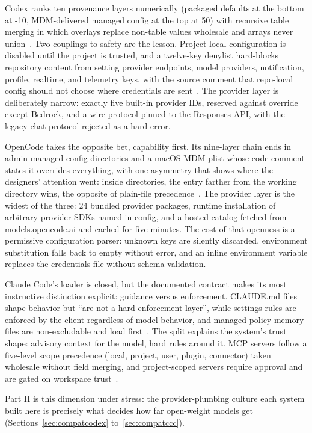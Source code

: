 \documentclass{article}
\newcommand{\codex}[0]{Codex}
\newcommand{\occ}[0]{OpenCode}
\newcommand{\ccc}[0]{Claude Code}
\begin{document}
\codex{} ranks ten provenance layers numerically (packaged defaults at
the bottom at -10, MDM-delivered managed config at the top at 50) with
recursive table merging in which overlays replace non-table values
wholesale and arrays never union~\citep{codexRepo}. Two couplings to
safety are the lesson. Project-local configuration is disabled until the
project is trusted, and a twelve-key denylist hard-blocks repository
content from setting provider endpoints, model providers, notification,
profile, realtime, and telemetry keys, with the source comment that
repo-local config should not choose where credentials are
sent~\citep{codexRepo}. The provider layer is deliberately narrow:
exactly five built-in provider IDs, reserved against override except
Bedrock, and a wire protocol pinned to the Responses API, with the legacy
chat protocol rejected as a hard error.

\occ{} takes the opposite bet, capability first. Its nine-layer chain
ends in admin-managed config directories and a macOS MDM plist whose code
comment states it overrides everything, with one asymmetry that shows
where the designers' attention went: inside  directories,
the entry farther from the working directory wins, the opposite of
plain-file precedence~\citep{opencodeRepo}. The provider layer is the
widest of the three: 24 bundled provider packages, runtime installation
of arbitrary provider SDKs named in config, and a hosted catalog fetched
from models.opencode.ai and cached for five minutes. The cost of that
openness is a permissive configuration parser: unknown keys are silently
discarded, environment substitution falls back to empty without error,
and an inline environment variable replaces the credentials file without
schema validation.

\ccc{}'s loader is closed, but the documented contract makes its most
instructive distinction explicit: guidance versus enforcement. CLAUDE.md
files shape behavior but ``are not a hard enforcement layer'', while
settings rules are enforced by the client regardless of model behavior,
and managed-policy memory files are non-excludable and load
first~\citep{claudeCodeDocsMemory}. The split explains the system's trust
shape: advisory context for the model, hard rules around it. MCP servers
follow a five-level scope precedence (local, project, user, plugin,
connector) taken wholesale without field merging, and project-scoped
 servers require approval and are gated on workspace
trust~\citep{claudeCodeDocsMcp}.

Part II is this dimension under stress: the provider-plumbing culture
each system built here is precisely what decides how far open-weight
models get (Sections~\ref{sec:compatcodex}
to~\ref{sec:compatccc}).
\end{document}
